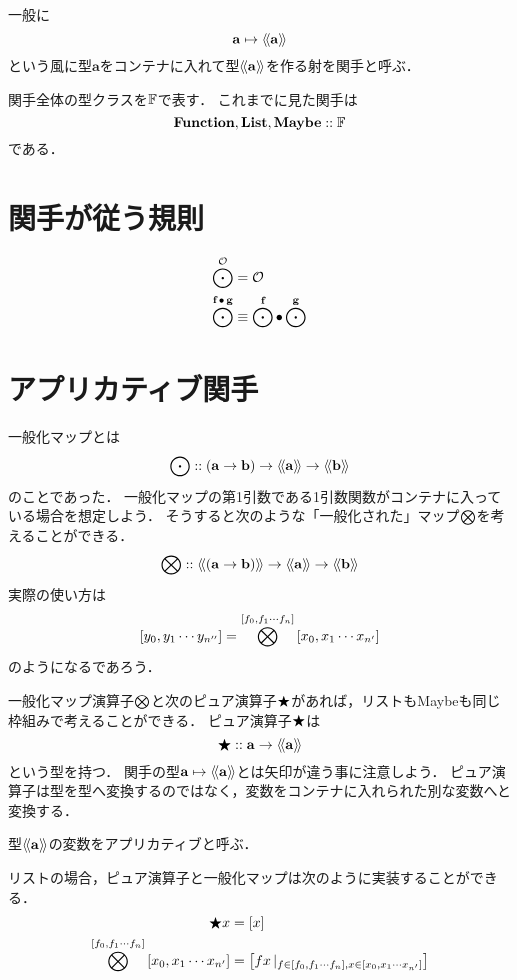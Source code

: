 \documentclass[twocolumn]{jsbook}
\newcommand{\typename}[1]{\mathbf{#1}}
\newcommand{\listtype}[1]{\left[#1\right]}
\newcommand{\guard}[1]{\mathop{\mid_{#1}}}
\newcommand{\mathidentity}{\mathcal{O}}
\begin{document}
一般に$$\typename{a}\mapsto\generalcontainer{\typename{a}}$$という風に型$\typename{a}$をコンテナに入れて型$\generalcontainer{\typename{a}}$を作る射を関手と呼ぶ．

関手全体の型クラスを$\mathbb{F}$で表す．
これまでに見た関手は$$\mathop{\mathop{\textbf{Function}}},\mathop{\mathop{\textbf{List}}},\mathop{\mathop{\textbf{Maybe}}}::\mathbb{F}$$である．


\section{関手が従う規則}

\begin{align}
\mapfunc^\mathidentity&=\mathidentity\\
\mapfunc^{\functor{f}\comp\functor{g}}&\equiv\mapfunc^{\functor{f}}\comp\mapfunc^{\functor{g}}
\end{align}

\section{アプリカティブ関手}

一般化マップとは$$\mapfunc::(\typename{a}\rightarrow\typename{b})\rightarrow\generalcontainer{\typename{a}}\rightarrow\generalcontainer{\typename{b}}$$のことであった．
一般化マップの第1引数である1引数関数がコンテナに入っている場合を想定しよう．
そうすると次のような「一般化された」マップ$\bigotimes$を考えることができる．
$$\applicativefunc::\generalcontainer{(\typename{a}\rightarrow\typename{b})}\rightarrow\generalcontainer{\typename{a}}\rightarrow\generalcontainer{\typename{b}}$$
実際の使い方は$$\listtype{y_0,y_1\dotsb y_{n''}}=\applicativefunc^{\listtype{f_0,f_1\dotsb f_n}}\listtype{x_0,x_1\dotsb x_{n'}}$$のようになるであろう．

一般化マップ演算子$\bigotimes$と次のピュア演算子$\bigstar$があれば，リストもMaybeも同じ枠組みで考えることができる．
ピュア演算子$\bigstar$は$$\pure::\typename{a}\rightarrow\generalcontainer{\typename{a}}$$という型を持つ．
関手の型$\typename{a}\mapsto\generalcontainer{\typename{a}}$とは矢印が違う事に注意しよう．
ピュア演算子は型を型へ変換するのではなく，変数をコンテナに入れられた別な変数へと変換する．

型$\generalcontainer{\typename{a}}$の変数をアプリカティブと呼ぶ．

リストの場合，ピュア演算子と一般化マップは次のように実装することができる．
\begin{align*}
\pure x&=\listtype{x}\\
\applicativefunc^{\listtype{f_0,f_1\dotsb f_n}}\listtype{x_0,x_1\dotsb x_{n'}}&=\listtype{fx\guard{f\in\listtype{f_0,f_1\dotsb f_n},x\in\listtype{x_0,x_1\dotsb x_{n'}}}}
\end{align*}
\end{document}
